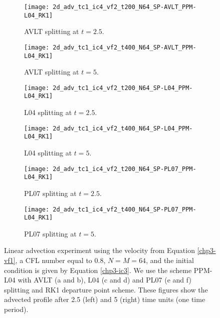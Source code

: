 \newpage
\begin{figure}[!htb]
	\centering
	\begin{subfigure}{0.4\textwidth}
		\centering
		\texttt{[image: 2d\_adv\_tc1\_ic4\_vf2\_t200\_N64\_SP-AVLT\_PPM-L04\_RK1]}
		\caption{AVLT splitting at $t=2.5$.\label{chp3-sec-exp-adv3-a}}
	\end{subfigure}
	\begin{subfigure}{0.4\textwidth}
		\centering
		\texttt{[image: 2d\_adv\_tc1\_ic4\_vf2\_t400\_N64\_SP-AVLT\_PPM-L04\_RK1]}
		\caption{AVLT splitting at $t=5$.\label{chp3-sec-exp-adv3-b}}
	\end{subfigure}
	
	\begin{subfigure}{0.4\textwidth}
		\centering
		\texttt{[image: 2d\_adv\_tc1\_ic4\_vf2\_t200\_N64\_SP-L04\_PPM-L04\_RK1]}
		\caption{L04 splitting at $t=2.5$.\label{chp3-sec-exp-adv3-c}}
	\end{subfigure}
	\begin{subfigure}{0.4\textwidth}
		\centering
		\texttt{[image: 2d\_adv\_tc1\_ic4\_vf2\_t400\_N64\_SP-L04\_PPM-L04\_RK1]}
		\caption{L04 splitting at $t=5$.\label{chp3-sec-exp-adv3-d}}
	\end{subfigure} 

	\begin{subfigure}{0.4\textwidth}
		\centering
		\texttt{[image: 2d\_adv\_tc1\_ic4\_vf2\_t200\_N64\_SP-PL07\_PPM-L04\_RK1]}
		\caption{PL07 splitting at $t=2.5$.\label{chp3-sec-exp-adv3-e}}
	\end{subfigure}
	\begin{subfigure}{0.4\textwidth}
		\centering
		\texttt{[image: 2d\_adv\_tc1\_ic4\_vf2\_t400\_N64\_SP-PL07\_PPM-L04\_RK1]}
		\caption{PL07 splitting at $t=5$.\label{chp3-sec-exp-adv3-f}}
	\end{subfigure} 
	
	\caption{Linear advection experiment using the velocity from Equation \eqref{chp3-vf1},
		a CFL number equal to $0.8$, $N=M=64$, and the initial condition is given by Equation \eqref{chp3-ic3}.
		We use the scheme PPM-L04 with AVLT  (a and b), L04 (c and d) and PL07 (e and f) splitting and RK1 departure point scheme.
		These figures show the advected profile after 2.5 (left) and 5  (right) time units (one time period).
		\label{chp3-sec-exp-adv3}}
\end{figure}


